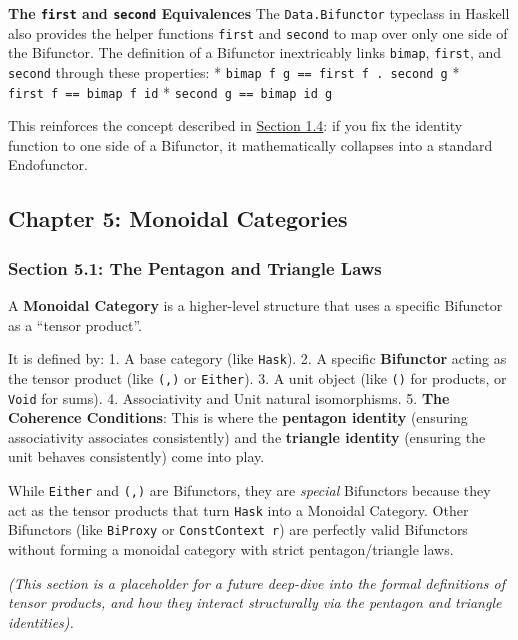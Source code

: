 \documentclass[
]{article}
\begin{document}
\textbf{The \texttt{first} and \texttt{second} Equivalences} The
\texttt{Data.Bifunctor} typeclass in Haskell also provides the helper
functions \texttt{first} and \texttt{second} to map over only one side
of the Bifunctor. The definition of a Bifunctor inextricably links
\texttt{bimap}, \texttt{first}, and \texttt{second} through these
properties: * \texttt{bimap\ f\ g\ ==\ first\ f\ .\ second\ g} *
\texttt{first\ f\ ==\ bimap\ f\ id} *
\texttt{second\ g\ ==\ bimap\ id\ g}

This reinforces the concept described in
\hyperref[section-13-the-algebra-of-functors-bifunctors]{Section 1.4}:
if you fix the identity function to one side of a Bifunctor, it
mathematically collapses into a standard Endofunctor.

\subsection{Chapter 5: Monoidal
Categories}\label{chapter-5-monoidal-categories}

\subsubsection{Section 5.1: The Pentagon and Triangle
Laws}\label{section-5.1-the-pentagon-and-triangle-laws}

A \textbf{Monoidal Category} is a higher-level structure that uses a
specific Bifunctor as a ``tensor product''.

It is defined by: 1. A base category (like \texttt{Hask}). 2. A specific
\textbf{Bifunctor} acting as the tensor product (like \texttt{(,)} or
\texttt{Either}). 3. A unit object (like \texttt{()} for products, or
\texttt{Void} for sums). 4. Associativity and Unit natural isomorphisms.
5. \textbf{The Coherence Conditions}: This is where the \textbf{pentagon
identity} (ensuring associativity associates consistently) and the
\textbf{triangle identity} (ensuring the unit behaves consistently) come
into play.

While \texttt{Either} and \texttt{(,)} are Bifunctors, they are
\emph{special} Bifunctors because they act as the tensor products that
turn \texttt{Hask} into a Monoidal Category. Other Bifunctors (like
\texttt{BiProxy} or \texttt{ConstContext\ r}) are perfectly valid
Bifunctors without forming a monoidal category with strict
pentagon/triangle laws.

\emph{(This section is a placeholder for a future deep-dive into the
formal definitions of tensor products, and how they interact
structurally via the pentagon and triangle identities).}
\end{document}
